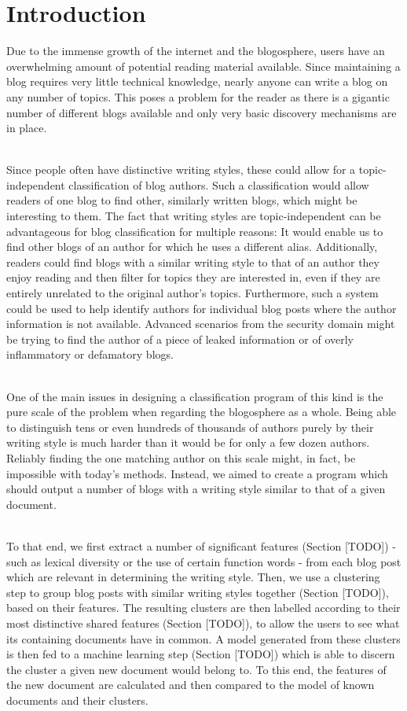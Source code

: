 
\section{Introduction}
\label{sec:introduction}

Due to the immense growth of the internet and the blogosphere, users have an overwhelming amount of potential reading material available.
Since maintaining a blog requires very little technical knowledge, nearly anyone can write a blog on any number of topics.
This poses a problem for the reader as there is a gigantic number of different blogs available and only very basic discovery mechanisms are in place.

\\
Since people often have distinctive writing styles, these could allow for a topic-independent classification of blog authors.
Such a classification would allow readers of one blog to find other, similarly written blogs, which might be interesting to them.
The fact that writing styles are topic-independent can be advantageous for blog classification for multiple reasons: It would enable us to find other blogs of an author for which he uses a different alias.
Additionally, readers could find blogs with a similar writing style to that of an author they enjoy reading and then filter for topics they are interested in, even if they are entirely unrelated to the original author's topics.
Furthermore, such a system could be used to help identify authors for individual blog posts where the author information is not available.
Advanced scenarios from the security domain might be trying to find the author of a piece of leaked information or of overly inflammatory or defamatory blogs.

\\
One of the main issues in designing a classification program of this kind is the pure scale of the problem when regarding the blogosphere as a whole.
Being able to distinguish tens or even hundreds of thousands of authors purely by their writing style is much harder than it would be for only a few dozen authors.
Reliably finding the one matching author on this scale might, in fact, be impossible with today's methods.
Instead, we aimed to create a program which should output a number of blogs with a writing style similar to that of a given document.

\\
To that end, we first extract a number of significant features (Section [TODO]) - such as lexical diversity or the use of certain function words - from each blog post which are relevant in determining the writing style.
Then, we use a clustering step to group blog posts with similar writing styles together (Section [TODO]), based on their features.
The resulting clusters are then labelled according to their most distinctive shared features (Section [TODO]), to allow the users to see what its containing documents have in common.
A model generated from these clusters is then fed to a machine learning step (Section [TODO]) which is able to discern the cluster a given new document would belong to.
To this end, the features of the new document are calculated and then compared to the model of known documents and their clusters.

